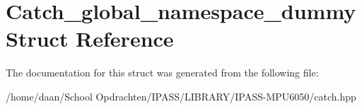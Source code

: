 \hypertarget{structCatch__global__namespace__dummy}{}\section{Catch\+\_\+global\+\_\+namespace\+\_\+dummy Struct Reference}
\label{structCatch__global__namespace__dummy}


The documentation for this struct was generated from the following file\+:\begin{DoxyCompactItemize}
\item 
/home/daan/\+School Opdrachten/\+I\+P\+A\+S\+S/\+L\+I\+B\+R\+A\+R\+Y/\+I\+P\+A\+S\+S-\/\+M\+P\+U6050/catch.\+hpp\end{DoxyCompactItemize}
